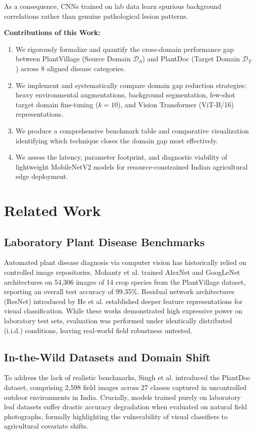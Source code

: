 \documentclass[twoside,a4paper,11pt]{article}
\begin{document}
As a consequence, CNNs trained on lab data learn spurious background correlations rather than genuine pathological lesion patterns. 

\textbf{Contributions of this Work:}
\begin{enumerate}
    \item We rigorously formalize and quantify the cross-domain performance gap between PlantVillage (Source Domain $\mathcal{D}_S$) and PlantDoc (Target Domain $\mathcal{D}_T$) across 8 aligned disease categories.
    \item We implement and systematically compare domain gap reduction strategies: heavy environmental augmentations, background segmentation, few-shot target domain fine-tuning ($k=10$), and Vision Transformer (ViT-B/16) representations.
    \item We produce a comprehensive benchmark table and comparative visualization identifying which technique closes the domain gap most effectively.
    \item We assess the latency, parameter footprint, and diagnostic viability of lightweight MobileNetV2 models \cite{Sandler:18} for resource-constrained Indian agricultural edge deployment.
\end{enumerate}

\section{Related Work}

\subsection{Laboratory Plant Disease Benchmarks}
Automated plant disease diagnosis via computer vision has historically relied on controlled image repositories. Mohanty et al. \cite{Mohanty:16} trained AlexNet and GoogLeNet architectures on 54,306 images of 14 crop species from the PlantVillage dataset, reporting an overall test accuracy of 99.35\%. Residual network architectures (ResNet) introduced by He et al. \cite{He:16} established deeper feature representations for visual classification. While these works demonstrated high expressive power on laboratory test sets, evaluation was performed under identically distributed (i.i.d.) conditions, leaving real-world field robustness untested.

\subsection{In-the-Wild Datasets and Domain Shift}
To address the lack of realistic benchmarks, Singh et al. \cite{Singh:20} introduced the PlantDoc dataset, comprising 2,598 field images across 27 classes captured in uncontrolled outdoor environments in India. Crucially, models trained purely on laboratory leaf datasets suffer drastic accuracy degradation when evaluated on natural field photographs, formally highlighting the vulnerability of visual classifiers to agricultural covariate shifts.
\end{document}
